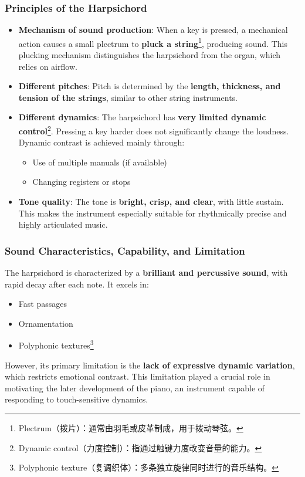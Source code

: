 \documentclass[math,code]{amznotes}
\theoremstyle{remark}
\begin{document}
\subsubsection{Principles of the Harpsichord}
\begin{itemize}
    \item \textbf{Mechanism of sound production}: When a key is pressed, a mechanical action causes a small plectrum to \textbf{pluck a string}\footnote{Plectrum（拨片）：通常由羽毛或皮革制成，用于拨动琴弦。}, producing sound. This plucking mechanism distinguishes the harpsichord from the organ, which relies on airflow.
    \item \textbf{Different pitches}: Pitch is determined by the \textbf{length, thickness, and tension of the strings}, similar to other string instruments.
    \item \textbf{Different dynamics}: The harpsichord has \textbf{very limited dynamic control}\footnote{Dynamic control（力度控制）：指通过触键力度改变音量的能力。}. Pressing a key harder does not significantly change the loudness. Dynamic contrast is achieved mainly through:
    \begin{itemize}
        \item Use of multiple manuals (if available)
        \item Changing registers or stops
    \end{itemize}
    \item \textbf{Tone quality}: The tone is \textbf{bright, crisp, and clear}, with little sustain. This makes the instrument especially suitable for rhythmically precise and highly articulated music.
\end{itemize}

\subsubsection{Sound Characteristics, Capability, and Limitation}

The harpsichord is characterized by a \textbf{brilliant and percussive sound}, with rapid decay after each note. It excels in:
\begin{itemize}
    \item Fast passages
    \item Ornamentation
    \item Polyphonic textures\footnote{Polyphonic texture（复调织体）：多条独立旋律同时进行的音乐结构。}
\end{itemize}

However, its primary limitation is the \textbf{lack of expressive dynamic variation}, which restricts emotional contrast. This limitation played a crucial role in motivating the later development of the piano, an instrument capable of responding to touch-sensitive dynamics.
\end{document}
